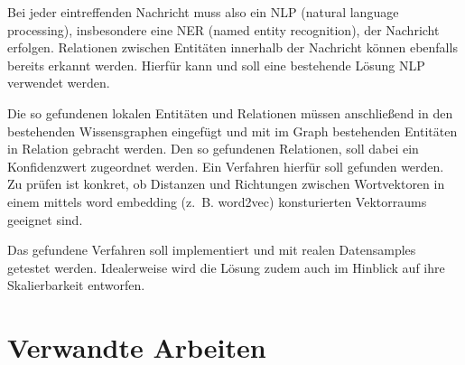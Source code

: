 \documentclass[12pt,a4paper,bibliography=totocnumbered,listof=totocnumbered]{scrartcl}
\begin{document}
Bei jeder eintreffenden Nachricht muss also ein NLP (natural language processing), insbesondere eine NER (named entity recognition), der Nachricht erfolgen. Relationen zwischen Entitäten innerhalb der Nachricht können ebenfalls bereits erkannt werden. Hierfür kann und soll eine bestehende Lösung NLP verwendet werden.

Die so gefundenen lokalen Entitäten und Relationen müssen anschließend in den bestehenden Wissensgraphen eingefügt und mit im Graph bestehenden Entitäten in Relation gebracht werden. Den so gefundenen Relationen, soll dabei ein Konfidenzwert zugeordnet werden. Ein Verfahren hierfür soll gefunden werden. Zu prüfen ist konkret, ob Distanzen und Richtungen zwischen Wortvektoren in einem mittels word embedding (z.~B. word2vec) konsturierten Vektorraums geeignet sind.

Das gefundene Verfahren soll implementiert und mit realen Datensamples getestet werden. Idealerweise wird die Lösung zudem auch im Hinblick auf ihre Skalierbarkeit entworfen.

\section{Verwandte Arbeiten}
\end{document}
